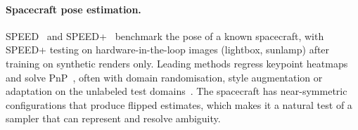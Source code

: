 \paragraph{Spacecraft pose estimation.}
SPEED~\cite{kisantal2020spec2019} and SPEED+~\cite{park2022speedplus} benchmark the pose of a known spacecraft, with SPEED+ testing on
hardware-in-the-loop images (lightbox, sunlamp) after training on synthetic renders only. Leading methods regress keypoint heatmaps and
solve PnP~\cite{chen2019satellite}, often with domain randomisation, style augmentation or adaptation on the unlabeled test
domains~\cite{park2022speedplus,park2024spnv2,park2023spec2021}. The spacecraft has near-symmetric configurations that produce
flipped estimates, which makes it a natural test of a sampler that can represent and resolve ambiguity.
